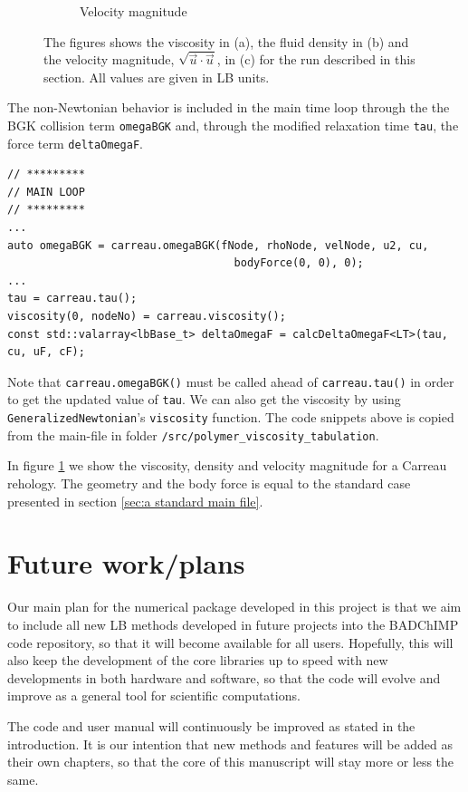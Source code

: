\documentclass[11pt,a4paper]{report}
\begin{document}
\begin{figure}[!h]
\begin{subfigure}{0.30\textwidth}
		\caption{Velocity magnitude}
	\end{subfigure}	
	\caption{The figures shows the viscosity in (a), the fluid density in (b) and the velocity magnitude, $\sqrt{\vec{u}\cdot\vec{u}}$, in (c) for the run described in this section. All values are given in LB units.}
	\label{fig:polymer rho vel}
\end{figure}

The non-Newtonian behavior is included in the main time loop through the the BGK collision term \texttt{omegaBGK} and, through the modified relaxation time \texttt{tau}, the force term \texttt{deltaOmegaF}.
\begin{verbatim}
// *********
// MAIN LOOP
// *********
...
auto omegaBGK = carreau.omegaBGK(fNode, rhoNode, velNode, u2, cu,
                                   bodyForce(0, 0), 0);
...
tau = carreau.tau();
viscosity(0, nodeNo) = carreau.viscosity();
const std::valarray<lbBase_t> deltaOmegaF = calcDeltaOmegaF<LT>(tau, cu, uF, cF);
\end{verbatim}
Note that \texttt{carreau.omegaBGK()} must be called ahead of \texttt{carreau.tau()} in order to get the updated value of \texttt{tau}. We can also get the viscosity by using \texttt{GeneralizedNewtonian}'s \texttt{viscosity} function. The code snippets above is copied from the main-file in folder \texttt{/src/polymer\_viscosity\_tabulation}.
    

In figure \ref{fig:polymer rho vel} we show the viscosity, density and velocity magnitude for a Carreau rehology. The geometry and the body force is equal to the standard case presented in section \ref{sec:a standard main file}.

\chapter{Future work/plans} 

Our main plan for the numerical package developed in this project is that we aim to include all new LB methods developed in future projects into the BADChIMP code repository, so that it will become available for all users. Hopefully, this will also keep the development of the core libraries up to speed with new developments in both hardware and software, so that the code will evolve and improve as a general tool for scientific computations.    

The code and user manual will continuously be improved as stated in the introduction. It is our intention that new methods and features will be added as their own chapters, so that the core of this manuscript will stay more or less the same. 
\end{document}
